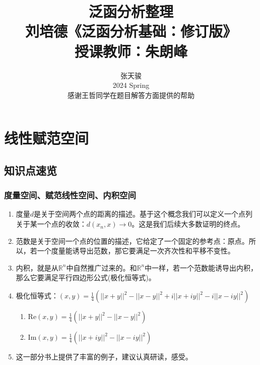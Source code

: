 \documentclass[a4paper, 12pt]{ctexart}
\author{张天骏 \\ 2024 Spring \\ 感谢王哲同学在题目解答方面提供的帮助}
\date{}
\title{泛函分析整理 \\ \large 刘培德《泛函分析基础：修订版》\\ 授课教师：朱朗峰}
\begin{document}
\maketitle


\newpage
\tableofcontents   


\newpage
\section{线性赋范空间}
\subsection{知识点速览}
\subsubsection{度量空间、赋范线性空间、内积空间}
\begin{enumerate}
    \item 度量$d$是关于空间两个点的距离的描述。基于这个概念我们可以定义一个点列关于某一个点的收敛：$d(x_n,x)\to 0$。这是我们后续大多数证明的终点。
    \item 范数是关于空间一个点的位置的描述，它给定了一个固定的参考点：原点。所以，若一个度量能诱导出范数，那它要满足一次齐次性和平移不变性。
    \item 内积，就是从$\mathbb{R}^n$中自然推广过来的。和$\mathbb{R}^n$中一样，若一个范数能诱导出内积，那么它要满足平行四边形公式(极化恒等式)。
    \item 极化恒等式：$(x,y)=\frac{1}{4}\left(||x+y||^2-||x-y||^2+i||x+iy||^2-i||x-iy||^2\right)$
    \begin{enumerate}
        \item $\text{Re}(x,y)=\frac{1}{4}\left(||x+y||^2-||x-y||^2\right)$
        \item $\text{Im}(x,y)=\frac{1}{4}\left(||x+iy||^2-||x-iy||^2\right)$
    \end{enumerate}
    \item 这一部分书上提供了丰富的例子，建议认真研读，感受。
\end{enumerate}
\end{document}
